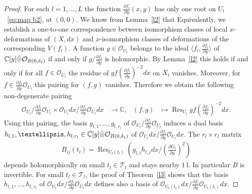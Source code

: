 \documentclass[11pt,twoside]{amsart}
\theoremstyle{plain}
\newcommand{\unity}{{1\!\!\!\:\mathrm{l}}}
\newcommand{\C}{\mathbb{C}}
\newcommand{\Tm}{\mathcal{T}}
\newcommand{\Sh}[1]{\mathcal{#1}} %
\DeclareMathOperator*{\Res}{Res}
\newcommand{\dfx}{dx}
\begin{document}
\begin{proof}
For each $l=1,\ldots,L$ the function $\frac{\partial f_l}{\partial y}(x,y)$ has  only one root on $U_l$~\eqref{eq:map b2},  at $ (0, 0) $. We know from Lemma~\ref{l2} that Equivalently, we establish a one-to-one correspondence between isomorphism classes of local $x$-deformations of $(X,\dfx)$ and $x$-isomorphism classes of deformations of the corresponding $V(f_l)$. A function $g\in\Sh{O}_{U_l}$ belongs to the ideal $\langle f_l,\frac{\partial f_l}{\partial y}\rangle$ of $\mathbb{C}[y]\Hat{\otimes}\Sh{O}_{B(0,\delta_1)}$ if and only if $g/\frac{\partial f_l}{\partial y}$ is holomorphic. By Lemma~\ref{l2} this holds if and only if for all $f\in\Sh{O}_{U_l}$ the residue of $gf(\frac{\partial f_l}{\partial y})^{-2}\dfx$ on $X_l$ vanishes. Moreover, for $f\in\frac{\partial f_l}{\partial y}\Sh{O}_{U_l}$ this pairing for $(f,g)$ vanishes. Therefore we obtain the following non-degenerate pairing
\begin{align}\label{eq:pairing}
\Sh{O}_{U_l}\big/\frac{\partial f_l}{\partial y}\Sh{O}_{U_l}\times \Sh{O}_{U_l}\dfx\big/\frac{\partial f_l}{\partial y}\Sh{O}_{U_l}\dfx&\rightarrow\C,&
(f,g)&\mapsto\Res_{U_l} gf(\frac{\partial f_l}{\partial y})^{-2}\dfx.
\end{align}
Using this pairing, the basis $g_{l,1},\ldots,g_{l,{r_l}}$ of $ \Sh{O}_{U_l}\big/\frac{\partial f_l}{\partial y}\Sh{O}_{U_l} $ induces a dual basis  $h_{l,1},\ldots,h_{l,{r_l}}\in\mathbb{C}[y]\Hat{\otimes}\Sh{O}_{B(0,\delta_1)}$ of $ 
\Sh{O}_{U_l}\dfx\big/\frac{\partial f_l}{\partial y}\Sh{O}_{U_l}\dfx$.
The ${r_l}\times {r_l}$ matrix
%
\begin{align*}%
B_{ij} (t_l) =\Res_{U_l(t_l)}\left(g_{l,i}h_{l,j}\dfx\big/\left(\frac{\partial G_l}{\partial y}\right)^2\right)
\end{align*}
%
depends holomorphically on small $t_l\in\Tm_l$ and stays nearby $\unity$. In particular $B$ is invertible. For small $t_l\in\Tm_l$, the proof of Theorem~\ref{l3} shows that the basis $h_{l,1},\ldots,h_{l,{r_l}}$ of $\Sh{O}_{U_l}\dfx\big/\frac{\partial f_l}{\partial y}\Sh{O}_{U_l}\dfx$ defines also a basis of $\Sh{O}_{U_l(t_l)}\dfx/\frac{\partial f_l}{\partial y}\Sh{O}_{U_l(t_l)}\dfx$.

\end{proof}
\end{document}
